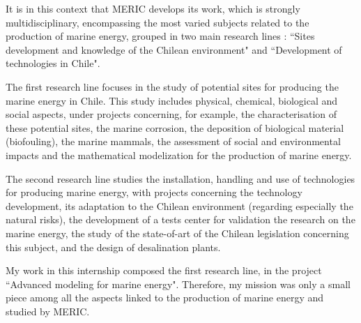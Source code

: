 \indent It is in this context that MERIC develops its work, which is strongly multidisciplinary, encompassing the most varied subjects related to the production of marine energy, grouped in two main research lines : ``Sites development and knowledge of the Chilean environment" and ``Development of technologies in Chile".

\indent The first research line focuses in the study of potential sites for producing the marine energy in Chile. This study includes physical, chemical, biological and social aspects, under projects concerning, for example, the characterisation of these potential sites, the marine corrosion, the deposition of biological material (biofouling), the marine mammals, the assessment of social and environmental impacts and the mathematical modelization for the production of marine energy.  

\indent The second research line studies the installation, handling and use of technologies for producing marine energy, with projects concerning the technology development, its adaptation to the Chilean environment (regarding especially the natural risks), the development of a tests center for validation the research on the marine energy, the study of the state-of-art of the Chilean legislation concerning this subject, and the design of desalination plants.


\indent My work in this internship composed the first research line, in the project ``Advanced modeling for marine energy". Therefore, my mission was only a small piece among all the aspects linked to the production of marine energy and studied by MERIC.

